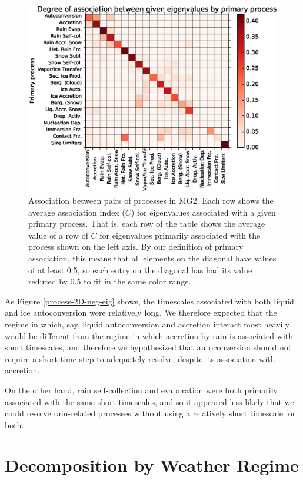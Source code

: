 \documentclass [11pt, proquest] {uwthesis}[2020/02/24]
\begin{document}
\begin{figure}[ht]
  \includegraphics[width=6.5in]{./process_association.eps}
  \caption{Association between pairs of processes in MG2. Each row shows the average association index ($C$) for eigenvalues associated with a given primary process. That is, each row of the table shows the average value of a row of $C$ for eigenvalues primarily associated with the process shown on the left axis. By our definition of primary association, this means that all elements on the diagonal have values of at least \num{0.5}, so each entry on the diagonal has had its value reduced by \num{0.5} to fit in the same color range.}
  \label{process-association}
\end{figure}

As Figure \ref{process-2D-neg-eig} shows, the timescales associated with both liquid and ice autoconversion were relatively long. We therefore expected that the regime in which, say, liquid autoconversion and accretion interact most heavily would be different from the regime in which accretion by rain is associated with short timescales, and therefore we hypothesized that autoconversion should not require a short time step to adequately resolve, despite its association with accretion.

On the other hand, rain self-collection and evaporation were both primarily associated with the same short timescales, and so it appeared less likely that we could resolve rain-related processes without using a relatively short timescale for both.

\section{Decomposition by Weather Regime} \label{sec:regime}
\end{document}

